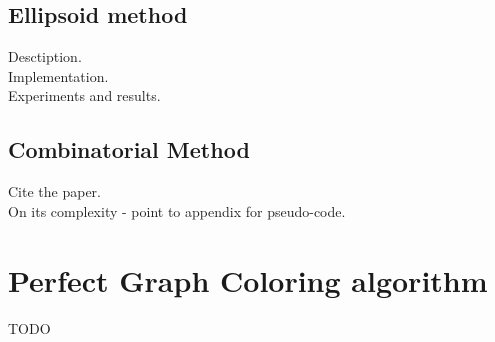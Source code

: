 \documentclass{article}
\begin{document}
\subsection{Ellipsoid method}

Desctiption.\\

Implementation.\\

Experiments and results.\\

\subsection{Combinatorial Method}

Cite the paper.\\

On its complexity - point to appendix for pseudo-code.

\appendix
\appendixpage
\addappheadtotoc

\section{Perfect Graph Coloring algorithm}
TODO
\end{document}

